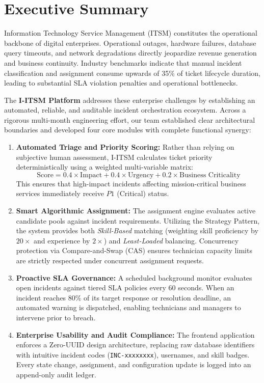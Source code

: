 \documentclass[11pt,a4paper,oneside]{report}
\begin{document}
\cleardoublepage
{}
{}
\chapter*{Executive Summary}
Information Technology Service Management (ITSM) constitutes the operational backbone of digital enterprises. Operational outages, hardware failures, database query timeouts, and network degradations directly jeopardize revenue generation and business continuity. Industry benchmarks indicate that manual incident classification and assignment consume upwards of 35\% of ticket lifecycle duration, leading to substantial SLA violation penalties and operational bottlenecks.

The \textbf{I-ITSM Platform} addresses these enterprise challenges by establishing an automated, reliable, and auditable incident orchestration ecosystem. Across a rigorous multi-month engineering effort, our team established clear architectural boundaries and developed four core modules with complete functional synergy:

\begin{enumerate}
    \item \textbf{Automated Triage and Priority Scoring:} Rather than relying on subjective human assessment, I-ITSM calculates ticket priority deterministically using a weighted multi-variable matrix:
    \[
    \text{Score} = 0.4 \times \text{Impact} + 0.4 \times \text{Urgency} + 0.2 \times \text{Business Criticality}
    \]
    This ensures that high-impact incidents affecting mission-critical business services immediately receive $P1$ (Critical) status.
    
    \item \textbf{Smart Algorithmic Assignment:} The assignment engine evaluates active candidate pools against incident requirements. Utilizing the Strategy Pattern, the system provides both \textit{Skill-Based} matching (weighting skill proficiency by $20\times$ and experience by $2\times$) and \textit{Least-Loaded} balancing. Concurrency protection via Compare-and-Swap (CAS) ensures technician capacity limits are strictly respected under concurrent assignment requests.
    
    \item \textbf{Proactive SLA Governance:} A scheduled background monitor evaluates open incidents against tiered SLA policies every 60 seconds. When an incident reaches 80\% of its target response or resolution deadline, an automated warning is dispatched, enabling technicians and managers to intervene prior to breach.
    
    \item \textbf{Enterprise Usability and Audit Compliance:} The frontend application enforces a Zero-UUID design architecture, replacing raw database identifiers with intuitive incident codes (\texttt{INC-xxxxxxxx}), usernames, and skill badges. Every state change, assignment, and configuration update is logged into an append-only audit ledger.
\end{enumerate}
\end{document}
